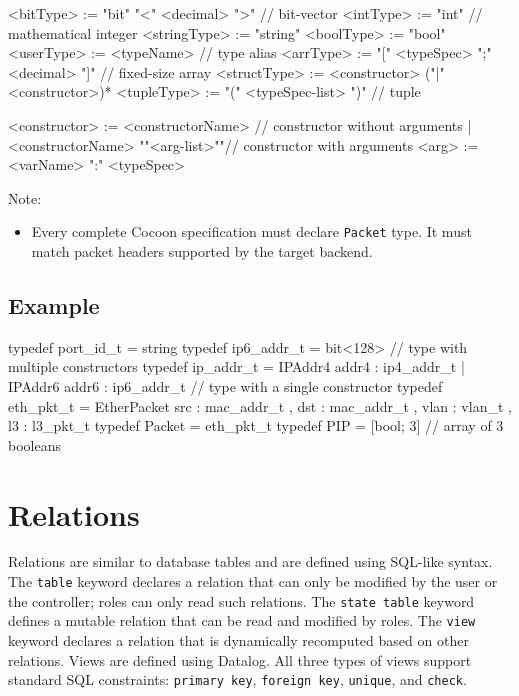 \documentclass{report}
\newcommand{\src}[1]{\texttt{#1}}
\begin{document}
\begin{bnflisting}{}
<bitType>    := "bit" "<" <decimal> ">"            // bit-vector
<intType>    := "int"                              // mathematical integer
<stringType> := "string"
<boolType>   := "bool"
<userType>   := <typeName>                         // type alias
<arrType>    := "[" <typeSpec> ";" <decimal> "]"   // fixed-size array
<structType> := <constructor> ("|" <constructor>)*
<tupleType>  := "(" <typeSpec-list> ")"            // tuple

<constructor> := <constructorName>                 // constructor without arguments
               | <constructorName> "{"<arg-list>"}"// constructor with arguments
<arg> := <varName> ":" <typeSpec>
\end{bnflisting}

Note:
\begin{itemize}
    \item Every complete Cocoon specification must declare \src{Packet} type.
        It must match packet headers supported by the target backend.
\end{itemize}

\subsection*{Example}

\begin{ccnlisting}{}
typedef port_id_t  = string
typedef ip6_addr_t = bit<128>
// type with multiple constructors
typedef ip_addr_t  = IPAddr4 {addr4 : ip4_addr_t}
                   | IPAddr6 {addr6 : ip6_addr_t}
// type with a single constructor
typedef eth_pkt_t = EtherPacket { src  : mac_addr_t
                                , dst  : mac_addr_t
                                , vlan : vlan_t
                                , l3   : l3_pkt_t}
typedef Packet = eth_pkt_t
typedef PIP = [bool; 3] // array of 3 booleans
\end{ccnlisting}

\section{Relations}

Relations are similar to database tables and are defined using SQL-like
syntax. The \src{table} keyword declares a relation that can only
be modified by the user or the controller; roles can only read such
relations.  The \src{state table} keyword defines a mutable relation 
that can be read and modified by roles.  The \src{view}
keyword declares a relation that is dynamically recomputed based on
other relations.  Views are defined using Datalog.  All three types of
views support standard SQL constraints: \src{primary key},
\src{foreign key}, \src{unique}, and \src{check}. 
\end{document}
